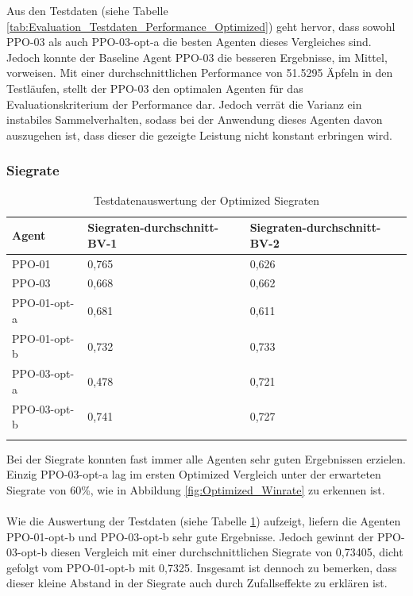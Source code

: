Aus den Testdaten (siehe Tabelle \ref{tab:Evaluation_Testdaten_Performance_Optimized}) geht hervor, dass sowohl PPO-03 als auch PPO-03-opt-a die besten Agenten dieses Vergleiches sind. Jedoch konnte der Baseline Agent PPO-03 die besseren Ergebnisse, im Mittel, vorweisen. Mit einer durchschnittlichen Performance von 51.5295 Äpfeln in den Testläufen, stellt der PPO-03 den optimalen Agenten für das Evaluationskriterium der Performance dar. Jedoch verrät die Varianz ein instabiles Sammelverhalten, sodass bei der Anwendung dieses Agenten davon auszugehen ist, dass dieser die gezeigte Leistung nicht konstant erbringen wird.

\subsubsection{Siegrate}
\begin{longtable}[h]{|p{3.7cm}|p{4cm}|p{4cm}|}
	\hline
	Agent & Siegraten-durchschnitt-BV-1 & Siegraten-durchschnitt-BV-2 \\
	\hline
	PPO-01 & 0,765 & 0,626 \\
	\hline
	PPO-03 & 0,668 & 0,662  \\
	\hline
	PPO-01-opt-a & 0,681 & 0,611  \\
	\hline
	PPO-01-opt-b & 0,732 & 0,733 \\
	\hline
	PPO-03-opt-a & 0,478 & 0,721 \\
	\hline
	PPO-03-opt-b & 0,741 & 0,727 \\
	\hline
	\caption{Testdatenauswertung der Optimized Siegraten}
	\label{tab:Evaluation_Testdaten_Winrate_Optimized} 
\end{longtable}
Bei der Siegrate konnten fast immer alle Agenten sehr guten Ergebnissen erzielen. Einzig PPO-03-opt-a lag im ersten Optimized Vergleich unter der erwarteten Siegrate von 60\%, wie in Abbildung \ref{fig:Optimized_Winrate} zu erkennen ist.\\
\\Wie die Auswertung der Testdaten (siehe Tabelle \ref{tab:Evaluation_Testdaten_Winrate_Optimized}) aufzeigt, liefern die Agenten PPO-01-opt-b und PPO-03-opt-b sehr gute Ergebnisse. Jedoch gewinnt der PPO-03-opt-b diesen Vergleich mit einer durchschnittlichen Siegrate von 0,73405, dicht gefolgt vom PPO-01-opt-b mit 0,7325. Insgesamt ist dennoch zu bemerken, dass dieser kleine Abstand in der Siegrate auch durch Zufallseffekte zu erklären ist.
